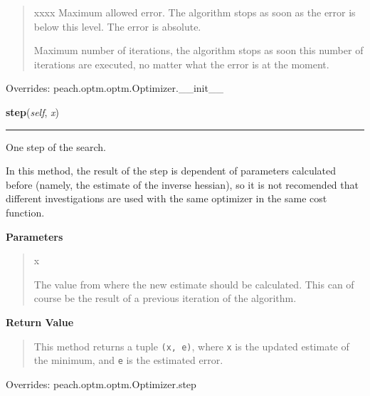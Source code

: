 \begin{boxedminipage}{\textwidth}
\begin{quote}
\begin{Ventry}{xxxx}
Maximum allowed error. The algorithm stops as soon as the error is
below this level. The error is absolute.
          \item[imax]


Maximum number of iterations, the algorithm stops as soon this
number of iterations are executed, no matter what the error is at
the moment.
        \end{Ventry}

      \end{quote}

    \vspace{1ex}

      Overrides: peach.optm.optm.Optimizer.\_\_init\_\_

    \end{boxedminipage}

    \vspace{0.5ex}

    \begin{boxedminipage}{\textwidth}

    \raggedright \textbf{step}(\textit{self}, \textit{x})

    \vspace{-1.5ex}

    \rule{\textwidth}{0.5\fboxrule}

One step of the search.

In this method, the result of the step is dependent of parameters
calculated before (namely, the estimate of the inverse hessian), so it
is not recomended that different investigations are used with the same
optimizer in the same cost function.
    \vspace{1ex}

      \textbf{Parameters}
      \begin{quote}
        \begin{Ventry}{x}

          \item[x]


The value from where the new estimate should be calculated. This can
of course be the result of a previous iteration of the algorithm.
        \end{Ventry}

      \end{quote}

    \vspace{1ex}

      \textbf{Return Value}
      \begin{quote}

This method returns a tuple \texttt{(x, e)}, where \texttt{x} is the updated
estimate of the minimum, and \texttt{e} is the estimated error.
      \end{quote}

    \vspace{1ex}

      Overrides: peach.optm.optm.Optimizer.step

    \end{boxedminipage}

